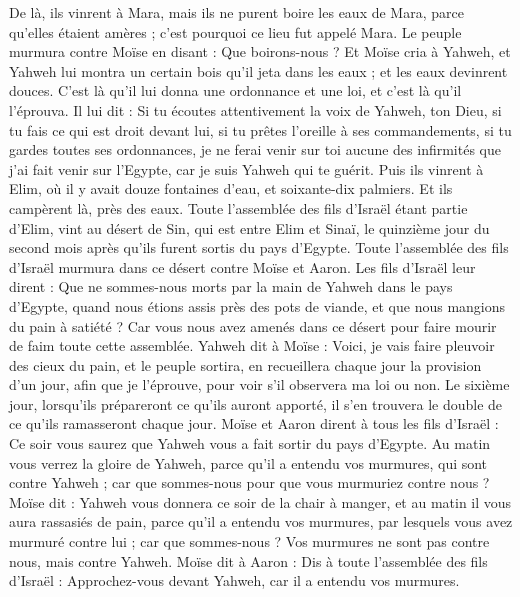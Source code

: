 \begin{multicols}{2}
De là, ils vinrent à Mara, mais ils ne purent boire les eaux de Mara, parce qu'elles étaient amères ; c'est pourquoi ce lieu fut appelé Mara.
Le peuple murmura contre Moïse en disant : Que boirons-nous ?
Et Moïse cria à Yahweh, et Yahweh lui montra un certain bois qu'il jeta dans les eaux ; et les eaux devinrent douces. C'est là qu'il lui donna une ordonnance et une loi, et c'est là qu'il l'éprouva.
Il lui dit : Si tu écoutes attentivement la voix de Yahweh, ton Dieu, si tu fais ce qui est droit devant lui, si tu prêtes l'oreille à ses commandements, si tu gardes toutes ses ordonnances, je ne ferai venir sur toi aucune des infirmités que j'ai fait venir sur l'Egypte, car je suis Yahweh qui te guérit.
Puis ils vinrent à Elim, où il y avait douze fontaines d'eau, et soixante-dix palmiers. Et ils campèrent là, près des eaux.
\VerseOne{}Toute l'assemblée des fils d'Israël étant partie d'Elim, vint au désert de Sin, qui est entre Elim et Sinaï, le quinzième jour du second mois après qu'ils furent sortis du pays d'Egypte.
Toute l'assemblée des fils d'Israël murmura dans ce désert contre Moïse et Aaron.
Les fils d'Israël leur dirent : Que ne sommes-nous morts par la main de Yahweh dans le pays d'Egypte, quand nous étions assis près des pots de viande, et que nous mangions du pain à satiété ? Car vous nous avez amenés dans ce désert pour faire mourir de faim toute cette assemblée.
Yahweh dit à Moïse : Voici, je vais faire pleuvoir des cieux du pain, et le peuple sortira, en recueillera chaque jour la provision d'un jour, afin que je l'éprouve, pour voir s'il observera ma loi ou non.
Le sixième jour, lorsqu’ils prépareront ce qu’ils auront apporté, il s’en trouvera le double de ce qu’ils ramasseront chaque jour.
Moïse et Aaron dirent à tous les fils d'Israël : Ce soir vous saurez que Yahweh vous a fait sortir du pays d'Egypte.
Au matin vous verrez la gloire de Yahweh, parce qu'il a entendu vos murmures, qui sont contre Yahweh ; car que sommes-nous pour que vous murmuriez contre nous ?
Moïse dit : Yahweh vous donnera ce soir de la chair à manger, et au matin il vous aura rassasiés de pain, parce qu'il a entendu vos murmures, par lesquels vous avez murmuré contre lui ; car que sommes-nous ? Vos murmures ne sont pas contre nous, mais contre Yahweh.
Moïse dit à Aaron : Dis à toute l'assemblée des fils d'Israël : Approchez-vous devant Yahweh, car il a entendu vos murmures.

\end{multicols}
